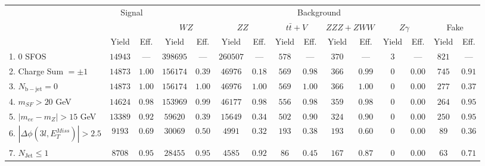 \begin{tabular}{l||c|c||c|c||c|c||c|c||c|c||c|c||c|c}
\hline
 & \multicolumn{2}{c||}{Signal}       &  \multicolumn{12}{c}{Background}  \\
 & &  & \multicolumn{2}{c||}{$WZ$} & \multicolumn{2}{c||}{$ZZ$} & \multicolumn{2}{c||}{$t\bar{t}+V$} & \multicolumn{2}{c||}{$ZZZ+ZWW$} & \multicolumn{2}{c||}{$Z\gamma$} & \multicolumn{2}{c}{Fake} \\ 
 & Yield & Eff. & Yield & Eff. & Yield & Eff. & Yield & Eff. & Yield & Eff. & Yield & Eff. & Yield & Eff. \\
\hline\hline
1. 0 SFOS &  $14943$ &  --- &  $398695$ &  --- &  $260507$ &  --- &  $578$ &  --- &  $370$ &  --- &  $3$ &  --- &  $821$ &  ---\\ 
\hline
2. Charge Sum $= \pm 1$ &  $14873$ &  $1.00$ &  $156174$ &  $0.39$ &  $46976$ &  $0.18$ &  $569$ &  $0.98$ &  $366$ &  $0.99$ &  $0$ &  $0.00$ &  $745$ &  $0.91$\\ 
\hline
3. $N_{\mathrm{b-jet}} = 0$ &  $14873$ &  $1.00$ &  $156174$ &  $1.00$ &  $46976$ &  $1.00$ &  $569$ &  $1.00$ &  $366$ &  $1.00$ &  $0$ &  $0.00$ &  $277$ &  $0.37$\\ 
\hline
4. $m_{SF} > 20$ GeV &  $14624$ &  $0.98$ &  $153969$ &  $0.99$ &  $46177$ &  $0.98$ &  $556$ &  $0.98$ &  $359$ &  $0.98$ &  $0$ &  $0.00$ &  $264$ &  $0.95$\\ 
\hline
5. $|m_{ee} - m_{Z}| > 15$ GeV &  $13389$ &  $0.92$ &  $59620$ &  $0.39$ &  $15649$ &  $0.34$ &  $502$ &  $0.90$ &  $324$ &  $0.90$ &  $0$ &  $0.00$ &  $250$ &  $0.95$\\ 
\hline
6. $|\Delta\phi(3l,E_{T}^{Miss})| > 2.5$ &  $9193$ &  $0.69$ &  $30069$ &  $0.50$ &  $4991$ &  $0.32$ &  $193$ &  $0.38$ &  $193$ &  $0.60$ &  $0$ &  $0.00$ &  $89$ &  $0.36$\\ 
\hline
7. $N_{\mathrm{Jet}} \leq 1$ &  $8708$ &  $0.95$ &  $28455$ &  $0.95$ &  $4585$ &  $0.92$ &  $86$ &  $0.45$ &  $167$ &  $0.87$ &  $0$ &  $0.00$ &  $63$ &  $0.71$\\ 
\hline
\end{tabular}
